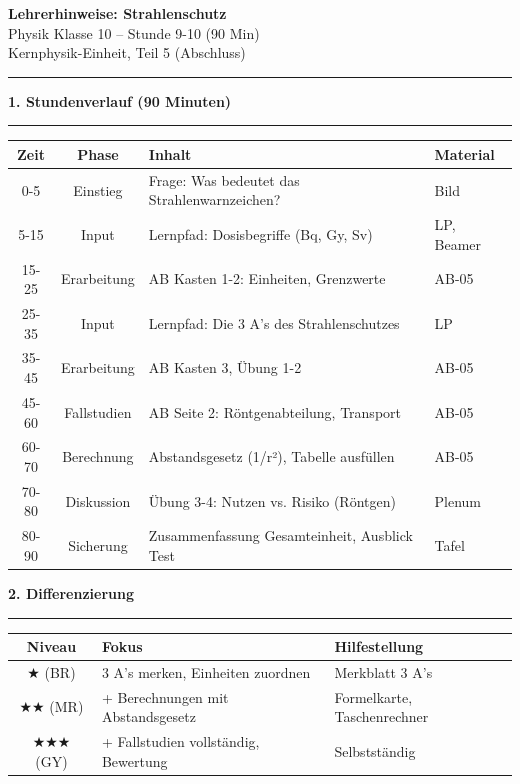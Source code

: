 \documentclass[11pt, a4paper]{article}
\newcommand{\abschnitt}[1]{%
    \vspace{10pt}\noindent\textbf{\textcolor{physik}{\large #1}}\vspace{6pt}\hrule\vspace{8pt}
}
\begin{document}
\begin{center}
{\LARGE\bfseries Lehrerhinweise: Strahlenschutz}\\[6pt]
{\large Physik Klasse 10 -- Stunde 9-10 (90 Min)}\\[4pt]
{\small\textcolor{grau}{Kernphysik-Einheit, Teil 5 (Abschluss)}}
\end{center}
\vspace{8pt}\hrule\vspace{12pt}

\abschnitt{1. Stundenverlauf (90 Minuten)}

\begin{tabularx}{\textwidth}{|c|c|X|l|}
\hline
\textbf{Zeit} & \textbf{Phase} & \textbf{Inhalt} & \textbf{Material} \\
\hline
0-5 & Einstieg & Frage: Was bedeutet das Strahlenwarnzeichen? & Bild \\
\hline
5-15 & Input & Lernpfad: Dosisbegriffe (Bq, Gy, Sv) & LP, Beamer \\
\hline
15-25 & Erarbeitung & AB Kasten 1-2: Einheiten, Grenzwerte & AB-05 \\
\hline
25-35 & Input & Lernpfad: Die 3 A's des Strahlenschutzes & LP \\
\hline
35-45 & Erarbeitung & AB Kasten 3, Übung 1-2 & AB-05 \\
\hline
45-60 & Fallstudien & AB Seite 2: Röntgenabteilung, Transport & AB-05 \\
\hline
60-70 & Berechnung & Abstandsgesetz (1/r²), Tabelle ausfüllen & AB-05 \\
\hline
70-80 & Diskussion & Übung 3-4: Nutzen vs. Risiko (Röntgen) & Plenum \\
\hline
80-90 & Sicherung & Zusammenfassung Gesamteinheit, Ausblick Test & Tafel \\
\hline
\end{tabularx}

\vspace{12pt}

\abschnitt{2. Differenzierung}

\begin{tabularx}{\textwidth}{|c|X|X|}
\hline
\textbf{Niveau} & \textbf{Fokus} & \textbf{Hilfestellung} \\
\hline
★ (BR) & 3 A's merken, Einheiten zuordnen & Merkblatt 3 A's \\
\hline
★★ (MR) & + Berechnungen mit Abstandsgesetz & Formelkarte, Taschenrechner \\
\hline
★★★ (GY) & + Fallstudien vollständig, Bewertung & Selbstständig \\
\hline
\end{tabularx}
\end{document}
